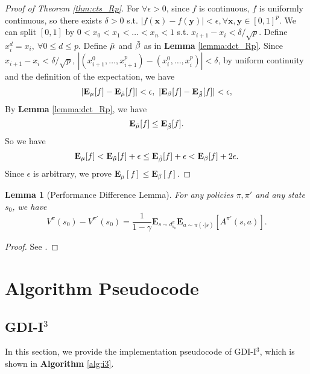 \documentclass[nohyperref]{article}
\theoremstyle{plain}
\newtheorem{Lemma}{\textbf{Lemma}}
\begin{document}
\begin{proof}[Proof of Theorem \ref{thm:cts_Rp}]


For $\forall \epsilon > 0$, since $f$ is continuous, $f$ is uniformly continuous, so there exists $\delta > 0$ s.t. $|f(\textbf{x}) - f(\textbf{y})| < \epsilon, \forall \textbf{x}, \textbf{y} \in [0, 1]^p$.
We can split $[0, 1]$ by $0 < x_0 < x_1 < \dots < x_n < 1$ s.t. $x_{i+1} - x_i < \delta / \sqrt{p}$.
Define $x_i^d = x_i, \ \forall 0 \leq d \leq p$.
Define $\Tilde{\mu}$ and $\Tilde{\beta}$ as in \textbf{Lemma} \ref{lemma:dct_Rp}.
Since $x_{i+1} - x_i < \delta / \sqrt{p}$, 
$|(x_{i+1}^0, \dots, x_{i+1}^p) - (x_{i}^0, \dots, x_{i}^p)| < \delta$, by uniform continuity and the definition of the expectation, we have
$$
| \textbf{E}_{\mu} [f] - \textbf{E}_{\Tilde{\mu}} [f] | < \epsilon,\ 
| \textbf{E}_{\beta} [f] - \textbf{E}_{\Tilde{\beta}} [f] | < \epsilon,
$$
By \textbf{Lemma} \ref{lemma:dct_Rp}, we have 
$$\textbf{E}_{\Tilde{\mu}} [f] \leq \textbf{E}_{\Tilde{\beta}} [f].$$
So we have
$$
\textbf{E}_{\mu} [f] 
< \textbf{E}_{\Tilde{\mu}} [f] + \epsilon
\leq \textbf{E}_{\Tilde{\beta}} [f] + \epsilon
< \textbf{E}_{\beta} [f] + 2\epsilon.
$$
Since $\epsilon$ is arbitrary, we prove $\textbf{E}_{\mu} [f] \leq \textbf{E}_{\beta} [f].$

\end{proof}

\begin{Lemma}[Performance Difference Lemma]
For any policies $\pi, \pi'$ and any state $s_0$, we have
\begin{equation*}
    V^{\pi} (s_0) - V^{\pi'} (s_0) = \frac{1}{1 - \gamma} \textbf{E}_{s \sim d_{s_0}^\pi} \textbf{E}_{a \sim \pi (\cdot | s)} \left[ A^{\pi'} (s, a) \right].
\end{equation*}
\label{lemma:perfdiff}
\end{Lemma}

\begin{proof}
    See \citep{kakade2002approximately}.
\end{proof}


\clearpage


\section{Algorithm Pseudocode}
\label{App: Algorithm Pseudocode}

\subsection{GDI-I$^3$}
In this section, we provide the implementation pseudocode of GDI-I$^3$, which is shown in \textbf{Algorithm} \ref{alg:i3}.
\end{document}
